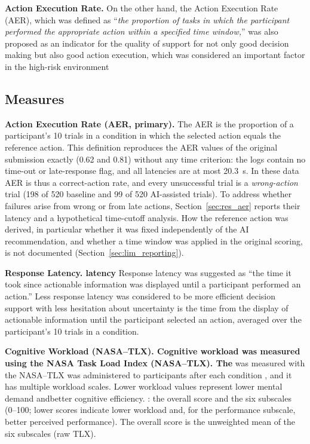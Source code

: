 \documentclass[journal]{IEEEtran}
\theoremstyle{plain}
\theoremstyle{definition}
\providecommand{\DIFaddtex}[1]{{\protect\color{blue} \sf #1}} %
\providecommand{\DIFdeltex}[1]{{\protect\color{red} \scriptsize #1}} %
\providecommand{\DIFaddbegin}{} %
\providecommand{\DIFaddend}{} %
\providecommand{\DIFdelbegin}{} %
\providecommand{\DIFdelend}{} %
\providecommand{\DIFadd}[1]{\texorpdfstring{\DIFaddtex{#1}}{#1}} %
\providecommand{\DIFdel}[1]{\texorpdfstring{\DIFdeltex{#1}}{}} %
\newcommand{\DIFscaledelfig}{0.5}
\newlength{\DIFdelgraphicswidth} %
\newlength{\DIFdelgraphicsheight} %
\newcommand{\DIFaddincludegraphics}[2][]{{\color{blue}\fbox{\DIFOincludegraphics[#1]{#2}}}} %
\newcommand{\DIFdelincludegraphics}[2][]{%
\sbox{\DIFdelgraphicsbox}{\DIFOincludegraphics[#1]{#2}}%
\settoboxwidth{\DIFdelgraphicswidth}{\DIFdelgraphicsbox} %
\settoboxtotalheight{\DIFdelgraphicsheight}{\DIFdelgraphicsbox} %
\scalebox{\DIFscaledelfig}{%
\parbox[b]{\DIFdelgraphicswidth}{\usebox{\DIFdelgraphicsbox}\\[-\baselineskip] \rule{\DIFdelgraphicswidth}{0em}}\llap{\resizebox{\DIFdelgraphicswidth}{\DIFdelgraphicsheight}{%
\setlength{\unitlength}{\DIFdelgraphicswidth}%
\begin{picture}(1,1)%
\thicklines\linethickness{2pt} %
{\color[rgb]{1,0,0}\put(0,0){\framebox(1,1){}}}%
{\color[rgb]{1,0,0}\put(0,0){\line( 1,1){1}}}%
{\color[rgb]{1,0,0}\put(0,1){\line(1,-1){1}}}%
\end{picture}%
}\hspace*{3pt}}} %
} %
\DeclareRobustCommand{\DIFaddbegin}{\DIFOaddbegin \let\includegraphics\DIFaddincludegraphics} %
\DeclareRobustCommand{\DIFaddend}{\DIFOaddend \let\includegraphics\DIFOincludegraphics} %
\DeclareRobustCommand{\DIFdelbegin}{\DIFOdelbegin \let\includegraphics\DIFdelincludegraphics} %
\DeclareRobustCommand{\DIFdelend}{\DIFOaddend \let\includegraphics\DIFOincludegraphics} %
\begin{document}
    \DIFdelbegin \DIFdel{\textbf{Action Execution Rate.}
    On the other hand, the Action Execution Rate (AER), which was defined as ``\textit{the proportion of tasks in which the participant performed the appropriate action within a specified time window,}'' was also proposed as an indicator for the quality of support for not only good decision making but also good action execution, which was considered an important factor in the high-risk environment}\DIFdelend \DIFaddbegin \subsection{\DIFadd{Measures}}
    \label{sec:measures}
    \DIFadd{\textbf{Action Execution Rate (AER, primary).}
    The AER is the proportion of a participant's 10 trials in a condition in which the selected action equals the reference action. This definition reproduces the AER values of the original submission exactly (0.62 and 0.81) without any time criterion: the logs contain no time-out or late-response flag, and all latencies are at most 20.3~s. In these data AER is thus a correct-action rate, and every unsuccessful trial is a \emph{wrong-action} trial (198 of 520 baseline and 99 of 520 AI-assisted trials). To address whether failures arise from wrong or from late actions, Section~\ref{sec:res_aer} reports their latency and a hypothetical time-cutoff analysis. How the reference action was derived, in particular whether it was fixed independently of the AI recommendation, and whether a time window was applied in the original scoring, is not documented (Section~\ref{sec:lim_reporting})}\DIFaddend .

    \textbf{Response \DIFdelbegin \DIFdel{Latency.}\DIFdelend \DIFaddbegin \DIFadd{latency}\DIFaddend } \DIFdelbegin \DIFdel{Response latency was suggested as “the time it took since actionable information was displayed until a participant performed an action.” Less response latency was considered to be more efficient decision support with less hesitation about uncertainty}\DIFdelend \DIFaddbegin \DIFadd{is the time from the display of actionable information until the participant selected an action, averaged over the participant's 10 trials in a condition}\DIFaddend .

    \textbf{\DIFdelbegin \DIFdel{Cognitive }\DIFdelend Workload\DIFdelbegin \DIFdel{(NASA--TLX).}%
\DIFdel{Cognitive workload was measured using the NASA Task Load Index (NASA--TLX). The }\DIFdelend \DIFaddbegin } \DIFadd{was measured with the }\DIFaddend NASA--TLX \DIFdelbegin \DIFdel{was administered to participants }\DIFdelend \DIFaddbegin \DIFadd{\cite{Hart1988} }\DIFaddend after each condition\DIFdelbegin \DIFdel{, and it has multiple workload scales. Lower workload values represent lower mental demand andbetter cognitive efficiency. }\DIFdelend \DIFaddbegin \DIFadd{: the overall score and the six subscales (0--100; lower scores indicate lower workload and, for the performance subscale, better perceived performance). The overall score is the unweighted mean of the six subscales (raw TLX).
}\DIFaddend 
\end{document}
